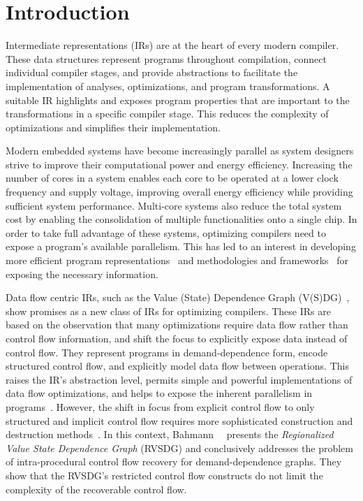 \section{Introduction}

Intermediate representations (IRs) are at the heart of every modern compiler. These data structures
represent programs throughout compilation, connect individual compiler stages, and provide
abstractions to facilitate the implementation of analyses, optimizations, and program
transformations. A suitable IR highlights and exposes program properties that are important to the
transformations in a specific compiler stage. This reduces the complexity of optimizations and
simplifies their implementation.


Modern embedded systems have become increasingly parallel %
as system designers strive to improve their computational power and energy
efficiency. %
Increasing the number of cores in a system enables each core to be operated at a
lower clock frequency and supply voltage, improving
overall energy efficiency while providing sufficient system performance. %
Multi-core systems also reduce the total system cost by enabling the consolidation
of multiple functionalities onto a single chip.
In order to take full advantage of these systems, optimizing compilers need to
expose a program's available parallelism. %
This has led to an interest in developing more efficient program
representations~\cite{Cordes10,Lattner20}
and methodologies and frameworks~\cite{Castrillon13} for exposing the necessary information.

Data flow centric IRs, such as the Value (State) Dependence Graph
(V(S)DG)~\cite{Weise94, Johnson03, Johnson04, Lawrence07, Stanier211, Stanier12}, show promises as a
new class of IRs for optimizing compilers. %
These IRs are based on the observation that many optimizations require data flow
rather than control flow information, and shift the focus to explicitly expose
data instead of control flow. %
They represent programs in demand-dependence form, encode structured control
flow, and explicitly model data flow between operations. %
This raises the IR's abstraction level, permits simple and powerful
implementations of data flow optimizations, and helps to expose the inherent
parallelism in programs~\cite{Lawrence07, Johnson04, Stanier211}. %
However, the shift in focus from explicit control flow to only structured and
implicit control flow requires more sophisticated construction and destruction
methods~\cite{Weise94, Lawrence07, Stanier12}. %
In this context, Bahmann~\etal~\cite{Bahmann15} presents the \emph{Regionalized Value State
Dependence Graph} (RVSDG) and conclusively addresses the problem of intra-procedural control
flow recovery for demand-dependence graphs. %
They show that the RVSDG's restricted control flow constructs do not limit the complexity of
the recoverable control flow. %


